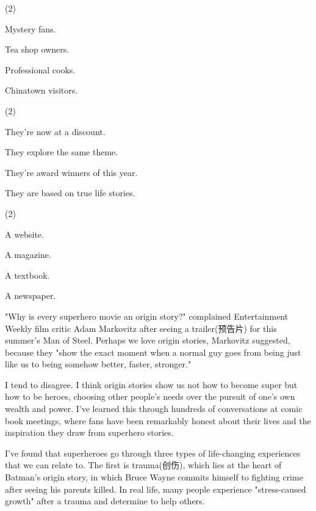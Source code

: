 \documentclass{英语试卷}
\begin{document}
\vspace{0.4em}
\begin{choices}(2)
  \item Mystery fans.
  \item Tea shop owners.
  \item Professional cooks.
  \item Chinatown visitors.
\end{choices}
\begin{choices}(2)
  \item They're now at a discount.
  \item They explore the same theme.
  \item They're award winners of this year.
  \item They are based on true life stories.
\end{choices}
\begin{choices}(2)
  \item A website.
  \item A magazine.
  \item A textbook.
  \item A newspaper.
\end{choices}
\par "Why is every superhero movie an origin story?" complained Entertainment Weekly film critic Adam Markovitz after seeing a trailer(预告片) for this summer’s Man of Steel. Perhaps we love origin stories, Markovitz suggested, because they "show the exact moment when a normal guy goes from being just like us to being somehow better, faster, stronger."\par
\par I tend to disagree. I think origin stories show us not how to become super but how to be heroes, choosing other people's needs over the pursuit of one's own wealth and power. I've learned this through hundreds of conversations at comic book meetings, where fans have been remarkably honest about their lives and the inspiration they draw from superhero stories.\par
\par I've found that superheroes go through three types of life-changing experiences that we can relate to. The first is trauma(创伤), which lies at the heart of Batman's origin story, in which Bruce Wayne commits himself to fighting crime after seeing his parents killed. In real life, many people experience "stress-caused growth" after a trauma and determine to help others.\par
\end{document}
